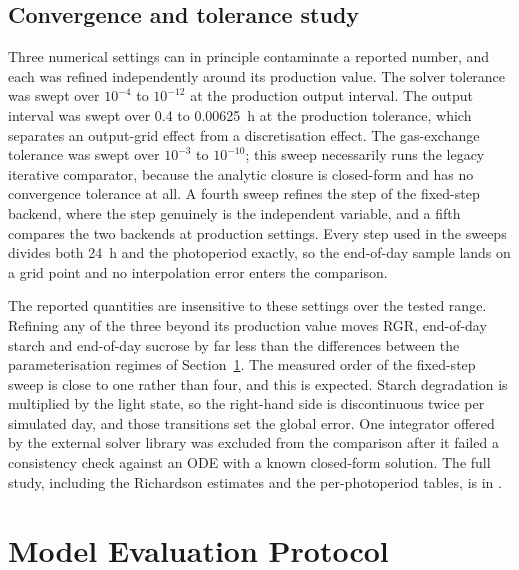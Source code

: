 \subsection{Convergence and tolerance study}

Three numerical settings can in principle contaminate a reported number, and
each was refined independently around its production value. The solver
tolerance was swept over $10^{-4}$ to $10^{-12}$ at the production output
interval. The output interval was swept over 0.4 to 0.00625~h at the production
tolerance, which separates an output-grid effect from a discretisation effect.
The gas-exchange tolerance was swept over $10^{-3}$ to $10^{-10}$; this sweep
necessarily runs the legacy iterative comparator, because the analytic closure
is closed-form and has no convergence tolerance at all. A fourth sweep refines
the step of the fixed-step backend, where the step genuinely is the independent
variable, and a fifth compares the two backends at production settings. Every
step used in the sweeps divides both 24~h and the photoperiod exactly, so the
end-of-day sample lands on a grid point and no interpolation error enters the
comparison.

The reported quantities are insensitive to these settings over the tested range.
Refining any of the three beyond its production value moves RGR, end-of-day
starch and end-of-day sucrose by far less than the differences between the
parameterisation regimes of Section~\ref{sec:protocol}. The
measured order of the fixed-step sweep is close to one rather than four, and
this is expected. Starch degradation is multiplied by the light state, so the
right-hand side is discontinuous twice per simulated day, and those transitions
set the global error. One integrator offered by the external solver library
was excluded from the comparison after it failed a consistency check against an
ODE with a known closed-form solution. The full study, including the
Richardson estimates and the per-photoperiod tables, is in
.


\section{Model Evaluation Protocol}
\label{sec:protocol}

